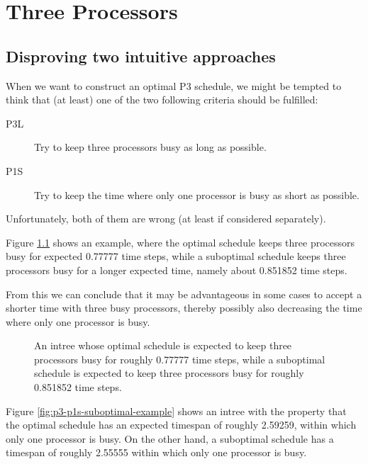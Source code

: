 \chapter{Three Processors}
\label{chap:p3}



\section{Disproving two intuitive approaches}
\label{sec:p3-disproving-long-p3-and-short-p1-time}

When we want to construct an optimal P3 schedule, we might be tempted to think that (at least) one of the two following criteria should be fulfilled:

\begin{description}
\item[P3L] Try to keep three processors busy as long as possible.
\item[P1S] Try to keep the time where only one processor is busy as short as possible.
\end{description}

Unfortunately, both of them are wrong (at least if considered separately).

Figure \ref{fig:p3-p3l-suboptimal-example} shows an example, where the optimal schedule keeps three processors busy for expected 0.77777 time steps, while a suboptimal schedule keeps three processors busy for a longer expected time, namely about 0.851852 time steps.

From this we can conclude that it may be advantageous in some cases to accept a shorter time with three busy processors, thereby possibly also decreasing the time where only one processor is busy.

\begin{figure}[ht]
  \centering
  
  \caption{An intree whose optimal schedule is expected to keep three processors busy for roughly 0.77777 time steps, while a suboptimal schedule is expected to keep three processors busy for roughly 0.851852 time steps.}
  \label{fig:p3-p3l-suboptimal-example}
\end{figure}

Figure \ref{fig:p3-p1s-suboptimal-example} shows an intree with the property that the optimal schedule has an expected timespan of roughly 2.59259, within which only one processor is busy. On the other hand, a suboptimal schedule has a timespan of roughly 2.55555 within which only one processor is busy.

